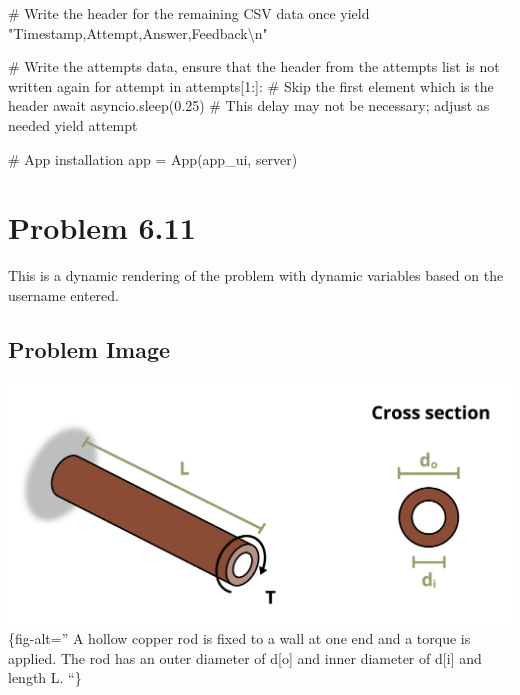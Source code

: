 \documentclass[
  letterpaper,
  DIV=11,
  numbers=noendperiod]{scrreprt}
\newenvironment{Shaded}{\begin{snugshade}}{\end{snugshade}}
\newcommand{\NormalTok}[1]{\textcolor[rgb]{0.00,0.23,0.31}{#1}}
\begin{document}
\begin{Shaded}
\begin{Highlighting}[]
\NormalTok{        \# Write the header for the remaining CSV data once}
\NormalTok{        yield "Timestamp,Attempt,Answer,Feedback\textbackslash{}n"}
        
\NormalTok{        \# Write the attempts data, ensure that the header from the attempts list is not written again}
\NormalTok{        for attempt in attempts[1:]:  \# Skip the first element which is the header}
\NormalTok{            await asyncio.sleep(0.25)  \# This delay may not be necessary; adjust as needed}
\NormalTok{            yield attempt}


\NormalTok{\# App installation}
\NormalTok{app = App(app\_ui, server)}
\end{Highlighting}
\end{Shaded}

\chapter*{Problem 6.11}\label{problem-6.11}


This is a dynamic rendering of the problem with dynamic variables based
on the username entered.

\section*{Problem Image}\label{problem-image-40}


\includegraphics{images/266.png}\{fig-alt='' A hollow copper rod is
fixed to a wall at one end and a torque is applied. The rod has an outer
diameter of d{[}o{]} and inner diameter of d{[}i{]} and length L. ``\}
\end{document}
